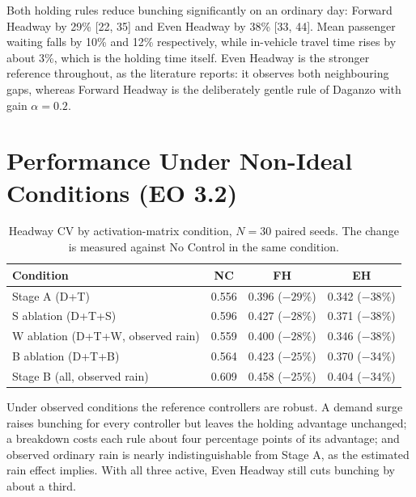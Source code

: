 Both holding rules reduce bunching significantly on an ordinary day: Forward Headway by 29\%
[22, 35] and Even Headway by 38\% [33, 44]. Mean passenger waiting falls by 10\% and 12\%
respectively, while in-vehicle travel time rises by about 3\%, which is the holding time itself. Even
Headway is the stronger reference throughout, as the literature reports: it observes both neighbouring
gaps, whereas Forward Headway is the deliberately gentle rule of Daganzo with gain $\alpha = 0.2$.

\section{Performance Under Non-Ideal Conditions (EO 3.2)}
\label{sec:results-eo32}

\begin{table}[htbp]
\centering
\caption[Single-disturbance ablations]{Headway CV by activation-matrix condition, $N = 30$ paired
seeds. The change is measured against No Control in the same condition.}
\label{tab:ablations}
\begin{tabular}{lccc}
\toprule
\textbf{Condition} & \textbf{NC} & \textbf{FH} & \textbf{EH} \\
\midrule
Stage A (D+T)                     & 0.556 & 0.396 ($-29\%$) & 0.342 ($-38\%$) \\
S ablation (D+T+S)                & 0.596 & 0.427 ($-28\%$) & 0.371 ($-38\%$) \\
W ablation (D+T+W, observed rain) & 0.559 & 0.400 ($-28\%$) & 0.346 ($-38\%$) \\
B ablation (D+T+B)                & 0.564 & 0.423 ($-25\%$) & 0.370 ($-34\%$) \\
Stage B (all, observed rain)      & 0.609 & 0.458 ($-25\%$) & 0.404 ($-34\%$) \\
\bottomrule
\end{tabular}
\end{table}

Under observed conditions the reference controllers are robust. A demand surge raises bunching for
every controller but leaves the holding advantage unchanged; a breakdown costs each rule about four
percentage points of its advantage; and observed ordinary rain is nearly indistinguishable from
Stage A, as the estimated rain effect implies. With all three active, Even Headway still cuts bunching
by about a third.

